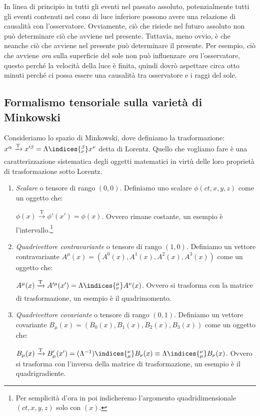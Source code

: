 In linea di principio in tutti gli eventi nel passato assoluto, potenzialmente tutti gli eventi contenuti nel cono di luce inferiore possono avere una relazione di causalità con l'osservatore. Ovviamente, ciò che risiede nel futuro assoluto non può determinare ciò che avviene nel presente. Tuttavia, meno ovvio, è che neanche ciò che avviene nel presente può determinare il presente. Per esempio, ciò che avviene \textit{ora} sulla superficie del sole non può influenzare \textit{ora} l'osservatore, questo perché la velocità della luce è finita, quindi dovrò aspettare circa otto minuti perché ci possa essere una causalità tra osservatore e i raggi del sole.



\subsection{Formalismo tensoriale sulla varietà di Minkowski}\label{sec:1.3}
Consideriamo lo spazio di Minkowski, dove definiamo la trasformazione: $x^{\alpha}\xrightarrow[\text{}]{\text{T}}x'^{\beta}=\Lambda\indices{^\beta_\nu} x^{\nu}$ detta di Lorentz.  
Quello che vogliamo fare è una caratterizzazione sistematica degli oggetti matematici in virtù delle loro proprietà di trasformazione sotto Lorentz. 

\begin{enumerate}
    \item \textit{Scalare} o tensore di rango $(0,0)$. Definiamo uno scalare $\phi(ct,x,y,z)$ come un oggetto che: 
    
    $\phi(x) \xrightarrow[\text{}]{\text{T}}\phi'(x')=\phi(x)$. Ovvero rimane costante, un esempio è l'intervallo.\footnote{Per semplicità d'ora in poi indicheremo l'argomento quadridimensionale $(ct,x,y,z)$ solo con $(x)$.}
    \item \textit{Quadrivettore contravariante} o tensore di rango $(1,0)$. Definiamo un vettore contravariante $A^{\mu}(x)=(A^0(x),A^1(x),A^2(x),A^3(x))$ come un oggetto che:
    
    $A^{\mu}(x)\xrightarrow[\text{}]{\text{T}}A'^{\mu}(x')=\Lambda\indices{^\mu_\nu} A^{\nu}(x)$. Ovvero si trasforma con la matrice di trasformazione, un esempio è il quadrimomento. 
    \item \textit{Quadrivettore covariante} o tensore di rango $(0,1)$. Definiamo un vettore covariante $B_{\mu}(x)=(B_0(x),B_1(x),B_2(x),B_3(x))$ come un oggetto che:
    
    $B_{\mu}(x)\xrightarrow{\text{T}}B'_{\mu}(x')=(\Lambda^{-1})\indices{^\nu_\mu} B_{\nu}(x)\equiv\Lambda\indices{_\mu^\nu} B_{\nu}(x)$. Ovvero si trasforma con l'inversa della matrice di trasformazione, un esempio è il quadrigradiente.
\end{enumerate}


